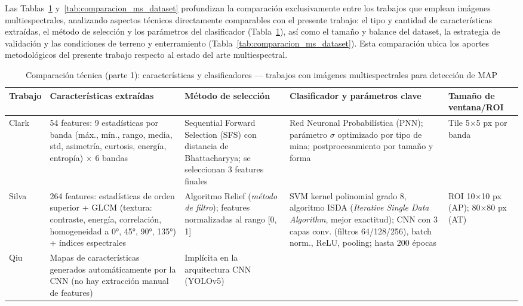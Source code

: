 Las Tablas~\ref{tab:comparacion_ms_features} y~\ref{tab:comparacion_ms_dataset}
profundizan la comparación exclusivamente entre los trabajos que emplean imágenes
multiespectrales, analizando aspectos técnicos directamente comparables con el
presente trabajo: el tipo y cantidad de características extraídas, el método de
selección y los parámetros del clasificador (Tabla~\ref{tab:comparacion_ms_features}),
así como el tamaño y balance del dataset, la estrategia de validación y las
condiciones de terreno y enterramiento (Tabla~\ref{tab:comparacion_ms_dataset}).
Esta comparación ubica los aportes metodológicos del presente trabajo
respecto al estado del arte multiespectral.

\clearpage
\begin{landscape}
\begin{table}
\centering
\caption{Comparación técnica (parte 1): características y clasificadores ---
         trabajos con imágenes multiespectrales para detección de \ac{MAP}}
\label{tab:comparacion_ms_features}
\footnotesize
\begin{tabularx}{\linewidth}{p{1.8cm} X X X p{2.5cm}}
\toprule
\textbf{Trabajo} & \textbf{Características extraídas} &
\textbf{Método de selección} & \textbf{Clasificador y parámetros clave} &
\textbf{Tamaño de ventana/ROI} \\
\midrule
Clark \etal{} \cite{clark2000}
  & 54 features: 9 estadísticas por banda (máx., mín., rango, media, std,
    asimetría, curtosis, energía, entropía) × 6 bandas
  & Sequential Forward Selection (SFS) con distancia de Bhattacharyya;
    se seleccionan 3 features finales
  & Red Neuronal Probabilística (PNN); parámetro $\sigma$ optimizado por
    tipo de mina; postprocesamiento por tamaño y forma
  & Tile 5×5 px por banda \\
\addlinespace
Silva \etal{} \cite{silva2019}
  & 264 features: estadísticas de orden superior + GLCM (textura:
    contraste, energía, correlación, homogeneidad a 0°, 45°, 90°, 135°)
    + índices espectrales
  & Algoritmo Relief (\textit{método de filtro}); features normalizadas
    al rango [0,\,1]
  & SVM kernel polinomial grado 8, algoritmo ISDA (\textit{Iterative Single Data Algorithm}, mejor exactitud);
    CNN con 3 capas conv. (filtros 64/128/256), batch norm., ReLU,
    pooling; hasta 200 épocas
  & ROI 10×10 px (AP); 80×80 px (AT) \\
\addlinespace
Qiu \etal{} \cite{qiu2023}
  & Mapas de características generados automáticamente por la CNN
    (no hay extracción manual de features)
  & Implícita en la arquitectura CNN (YOLOv5)

\end{tabularx}
\end{table}
\end{landscape}
